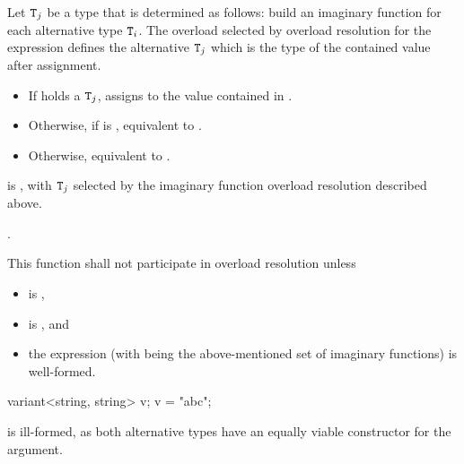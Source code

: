 \begin{itemdescr}
\pnum
Let $\texttt{T}_j$ be a type that is determined as follows:
build an imaginary function  for each alternative type
$\texttt{T}_i$. The overload  selected by overload
resolution for the expression  defines
the alternative $\texttt{T}_j$ which is the type of the contained value after
assignment.

\pnum
\effects
\begin{itemize}
\item
If  holds a $\texttt{T}_j$, assigns  to
the value contained in .
\item
Otherwise, if 
 is ,
equivalent to .
\item
Otherwise, equivalent to .
\end{itemize}

\pnum
\postconditions
{} is , with $\texttt{T}_j$
selected by the imaginary function overload resolution described above.

\pnum
\returns {}.

\pnum
\remarks
This function shall not participate in overload resolution unless
\begin{itemize}
\item
   is ,

\item
  is , and

\item
  the expression 
  (with  being the above-mentioned set
  of imaginary functions) is well-formed.
\end{itemize}

\pnum
\begin{note}
\begin{codeblock}
variant<string, string> v;
v = "abc";
\end{codeblock}
is ill-formed, as both alternative types have an equally viable constructor
for the argument. \end{note}


\end{itemdescr}

